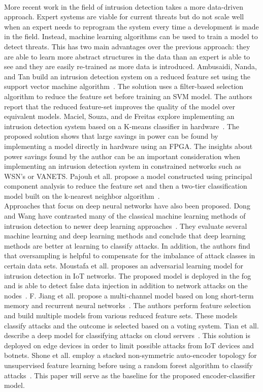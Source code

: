 \documentclass{article}
\begin{document}
\\
More recent work in the field of intrusion detection takes a more data-driven approach. Expert systems are viable for current threats but do not scale well when an expert needs to reprogram the system every time a development is made in the field. Instead, machine learning algorithms can be used to train a model to detect threats. This has two main advantages over the previous approach: they are able to learn more abstract structures in the data than an expert is able to see and they are easily re-trained as more data is introduced. Ambusaidi, Nanda, and Tan build an intrusion detection system on a reduced feature set using the support vector machine algorithm~\cite{deep3}. The solution uses a filter-based selection algorithm to reduce the feature set before training an SVM model. The authors report that the reduced feature-set improves the quality of the model over equivalent models. Maciel, Souza, and de Freitas explore implementing an intrusion detection system based on a K-means classifier in hardware~\cite{deep6}. The proposed solution shows that large savings in power can be found by implementing a model directly in hardware using an FPGA. The insights about power savings found by the author can be an important consideration when implementing an intrusion detection system in constrained networks such as WSN's or VANETS. Pajouh et all. propose a model constructed using principal component analysis to reduce the feature set and then a two-tier classification model built on the k-nearest neighbor algorithm~\cite{deep2}. 
\\
Approaches that focus on deep neural networks have also been proposed. Dong and Wang have contrasted many of the classical machine learning methods of intrusion detection to newer deep learning approaches~\cite{survey1}. They evaluate several machine learning and deep learning methods and conclude that deep learning methods are better at learning to classify attacks. In addition, the authors find that oversampling is helpful to compensate for the imbalance of attack classes in certain data sets. Moustafa et all. proposes an adversarial learning model for intrusion detection in IoT networks. The proposed model is deployed in the fog and is able to detect false data injection in addition to network attacks on the nodes~\cite{deep5}. F. Jiang et all. propose a multi-channel model based on long short-term memory and recurrent neural networks~\cite{deep7}. The authors perform feature selection and build multiple models from various reduced feature sets. These models classify attacks and the outcome is selected based on a voting system. Tian et all. describe a deep model for classifying attacks on cloud servers~\cite{deep8}. This solution is deployed on edge devices in order to limit possible attacks from IoT devices and botnets. Shone et all. employ a stacked non-symmetric auto-encoder topology for unsupervised feature learning before using a random forest algorithm to classify attacks~\cite{baseline1}. This paper will serve as the baseline for the proposed encoder-classifier model.
\end{document}
